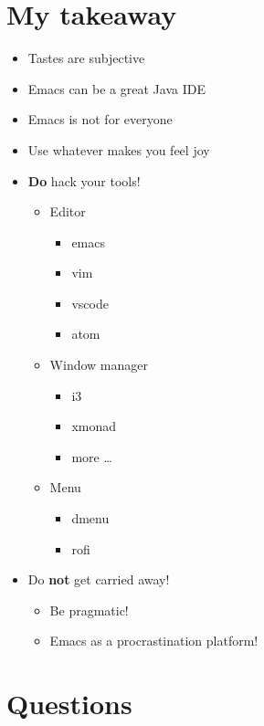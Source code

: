 \documentclass[presentation]{beamer}
\begin{document}
\section*{My takeaway}
\label{sec:org44754d2}

\begin{itemize}
\item Tastes are subjective
\item Emacs can be a great Java IDE
\item Emacs is not for everyone
\item Use whatever makes you feel joy

\item \textbf{Do} hack your tools!
\begin{itemize}
\item Editor
\begin{itemize}
\item emacs
\item vim
\item vscode
\item atom
\end{itemize}
\item Window manager
\begin{itemize}
\item i3
\item xmonad
\item more \ldots{}
\end{itemize}
\item Menu
\begin{itemize}
\item dmenu
\item rofi
\end{itemize}
\end{itemize}

\item Do \textbf{not} get carried away!
\begin{itemize}
\item Be pragmatic!
\item Emacs as a procrastination platform!
\end{itemize}
\end{itemize}

\section*{Questions}
\label{sec:orga19cddb}
\end{document}
